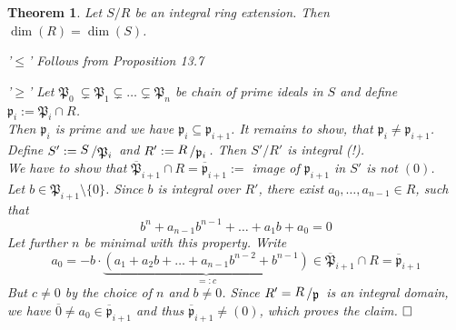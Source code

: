 \documentclass[11pt]{book}
\newtheorem{theorem}{Theorem}[section]
\theoremstyle{nonumberbreak}
\newenvironment{pr}[1][]{\ifthenelse{\equal{#1}{}}{\proof}{\proof[#1]}\rm}{\endproof}
\newcommand{\slant}[2]{{\raisebox{.1em}{$#1$}\left/\raisebox{-.1em}{$#2$}\right.}}
\begin{document}
\begin{spacing}{1.3}
\begin{theorem} %
Let $S/R$ be an integral ring extension. Then $\dim(R)=\dim(S)$.
\begin{pr}
\begin{compactenum}
\item['$\leqslant$'] Follows from Proposition 13.7
\item['$\geqslant$'] Let $\mathfrak{P}_0 \ \subsetneq \mathfrak{P}_1 \subsetneq \ldots \subsetneq \mathfrak{P}_n$ be chain of prime ideals in $S$ and define $\mathfrak{p}_i:=\mathfrak{P}_i \cap R$.\\
Then $\mathfrak{p}_i$ is prime and we have $\mathfrak{p}_i \subseteq \mathfrak{p}_{i+1}$. It remains to show, that $\mathfrak{p}_i \neq \mathfrak{p}_{i+1}$.\\
Define $S':=\slant{S}{\mathfrak{P}_i}$ and $R':=\slant{R}{\mathfrak{p}_i}$. Then $S'/R'$ is integral (!).\\
We have to show that $\overline{\mathfrak{P}}_{i+1} \cap R=\overline{\mathfrak{p}}_{i+1}:=$ image of $\mathfrak{p}_{i+1}$ in $S'$ is not $( 0 )$.\\
Let $b \in \mathfrak{P}_{i+1} \setminus \{0\}$. Since $b$ is integral over $R'$, there exist $a_0, \ldots, a_{n-1} \in R$, such that
$$b^n+a_{n-1}b^{n-1}+ \ldots +a_1b+a_0=0$$
Let further $n$ be minimal with this property. Write
$$a_0=-b \cdot \underbrace{\left( a_1+a_2b+ \ldots + a_{n-1}b^{n-2}+b^{n-1}\right)}_{=:c} \in \overline{\mathfrak{P}}_{i+1} \cap R=\overline{\mathfrak{p}}_{i+1}$$
But $c\neq 0$ by the choice of $n$ and $b \neq 0$. Since $R'=\slant{R}{\mathfrak{p}}$ is an integral domain, we have
$\overline{0} \neq a_0 \in \overline{\mathfrak{p}}_{i+1}$ and thus $\overline{\mathfrak{p}}_{i+1} \neq ( 0 )$,
which proves the claim. $\hfill \Box$
\end{compactenum}
\end{pr}
\end{theorem}


\end{spacing}
\end{document}
